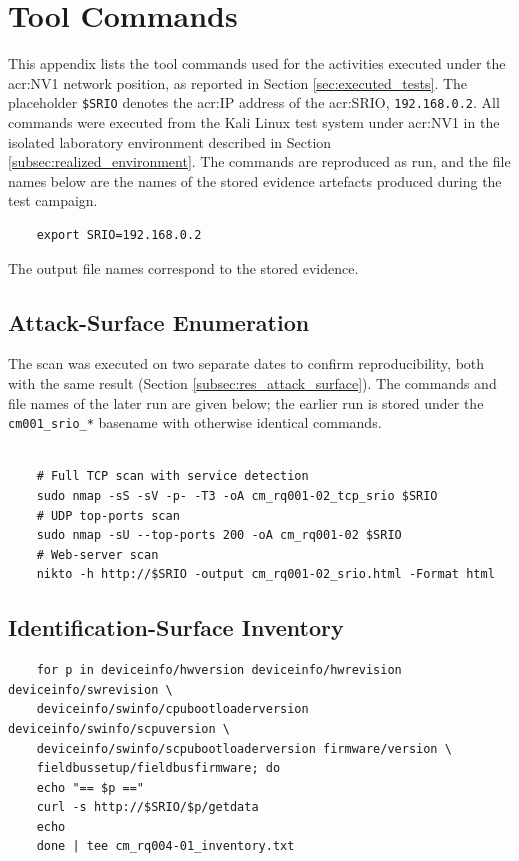 \chapter{Tool Commands}
\label{app:tool_commands}
This appendix lists the tool commands used for the activities executed under the \gls{acr:NV1} network position, as reported in Section \ref{sec:executed_tests}. The placeholder \texttt{\$SRIO} denotes the \gls{acr:IP} address of the \gls{acr:SRIO}, \texttt{192.168.0.2}.
All commands were executed from the Kali Linux test system under \gls{acr:NV1} in the isolated laboratory environment described in Section \ref{subsec:realized_environment}. The commands are reproduced as run, and the file names below are the names of the stored evidence artefacts produced during the test campaign.
\begin{verbatim}
	export SRIO=192.168.0.2
\end{verbatim}
The output file names correspond to the stored evidence.


\section{Attack-Surface Enumeration}
\label{app:cmd_attacksurface}
The scan was executed on two separate dates to confirm reproducibility, both with the same result (Section \ref{subsec:res_attack_surface}). The commands and file names of the later run are given below; the earlier run is stored under the \texttt{cm001\_srio\_*} basename with otherwise identical commands.
\begin{verbatim}
	
	# Full TCP scan with service detection
	sudo nmap -sS -sV -p- -T3 -oA cm_rq001-02_tcp_srio $SRIO
	# UDP top-ports scan
	sudo nmap -sU --top-ports 200 -oA cm_rq001-02 $SRIO
	# Web-server scan
	nikto -h http://$SRIO -output cm_rq001-02_srio.html -Format html
\end{verbatim}

\section{Identification-Surface Inventory}
\label{app:cmd_inventory}
\begin{verbatim}
	for p in deviceinfo/hwversion deviceinfo/hwrevision deviceinfo/swrevision \
	deviceinfo/swinfo/cpubootloaderversion deviceinfo/swinfo/scpuversion \
	deviceinfo/swinfo/scpubootloaderversion firmware/version \
	fieldbussetup/fieldbusfirmware; do
	echo "== $p =="
	curl -s http://$SRIO/$p/getdata
	echo
	done | tee cm_rq004-01_inventory.txt
\end{verbatim}

